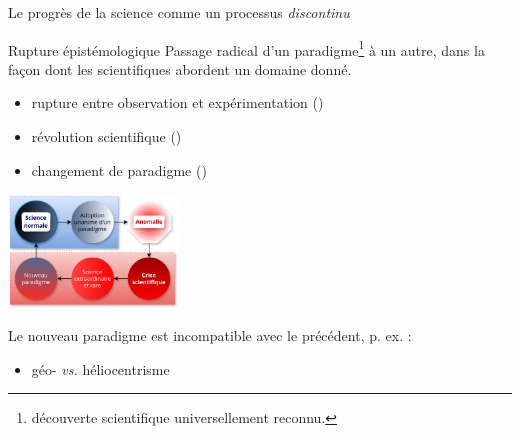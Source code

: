 \begin{frame}{Le progrès de la science comme un processus \textit{discontinu}}
\begin{block}{Rupture épistémologique}
Passage radical d'un paradigme\footnote{découverte scientifique universellement reconnu.} à un autre, dans la façon dont les scientifiques abordent un domaine donné.
\end{block}
\begin{itemize}
\item \og{}rupture entre observation et expérimentation\fg{} 
{\footnotesize(\cite{bachelard1934formation})}
\item \og{}révolution scientifique\fg{} {\footnotesize(\cite{koyre1957closed})}
\item \og{}changement de paradigme\fg{} {\footnotesize(\cite{kuhn1962structure})} 
\end{itemize} 
\begin{minipage}{5cm}
\includegraphics[height=3cm, width=4.5cm]{pic/changement_paradigme.png}
\end{minipage}%
\begin{minipage}{5cm}
Le nouveau paradigme est incompatible avec le précédent, p. ex. :
\begin{itemize}
\item géo- \textit{vs.} héliocentrisme
\end{itemize}
\end{minipage}
\end{frame}
